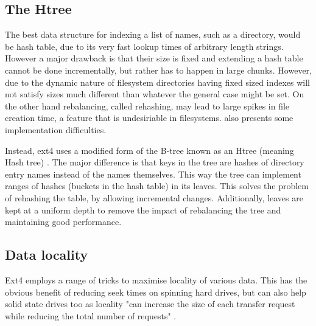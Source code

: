         \subsection{The Htree}
            \label{sec_htree}

            The best data structure for indexing a list of names, such as a
            directory, would be hash table, due to its very fast lookup times
            of arbitrary length strings. However a major drawback is that their
            size is fixed and extending a hash table cannot be done
            incrementally, but rather has to happen in large chunks. However,
            due to the dynamic nature of filesystem directories having fixed
            sized indexes will not satisfy sizes much different than whatever
            the general case might be set. On the other hand rebalancing,
            called rehashing, may lead to large spikes in file creation time, a
            feature that is undesiriable in filesystems. \citeauthor{HTree}
            also presents some implementation difficulties.

            Instead, ext4 uses a modified form of the B-tree known as an Htree
            (meaning Hash tree) \cite{HTree}. The major difference is that keys
            in the tree are hashes of directory entry names instead of the
            names themselves. This way the tree can implement ranges of hashes
            (buckets in the hash table) in its leaves. This solves the problem
            of rehashing the table, by allowing incremental changes.
            Additionally, leaves are kept at a uniform depth to remove the
            impact of rebalancing the tree and maintaining good performance.

        \subsection{Data locality}
            \label{sec_locality}

            Ext4 employs a range of tricks to maximise locality of various
            data. This has the obvious benefit of reducing seek times on
            spinning hard drives, but can also help solid state drives too as
            locality "can increase the size of each transfer request while
            reducing the total number of requests" \cite{ext4_docs}.

